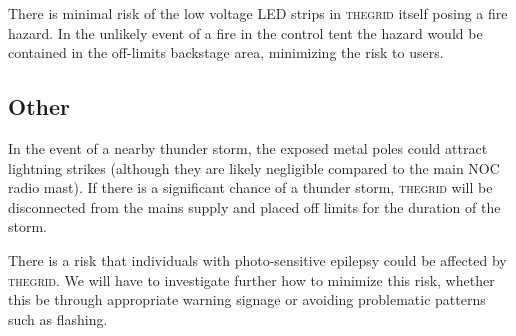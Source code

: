 \documentclass[12pt]{article} %
\newcommand{\thegrid}{\textsc{the\textperiodcentered grid}\xspace}
\begin{document}
There is minimal risk of the low voltage LED strips in \thegrid itself posing a fire hazard.  In the unlikely event of a fire in the control tent the hazard would be contained in the off-limits backstage area, minimizing the risk to users.

\subsection{Other}
In the event of a nearby thunder storm, the exposed metal poles could attract lightning strikes (although they are likely negligible compared to the main NOC radio mast).  If there is a significant chance of a thunder storm, \thegrid will be disconnected from the mains supply and placed off limits for the duration of the storm.

There is a risk that individuals with photo-sensitive epilepsy could be affected by \thegrid.  We will have to investigate further how to minimize this risk, whether this be through appropriate warning signage or avoiding problematic patterns such as flashing.
\end{document}
